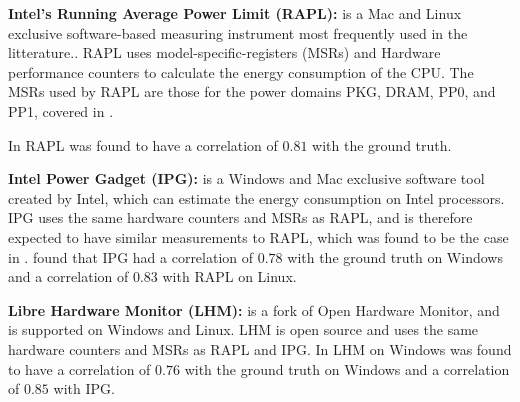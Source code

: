 \noindent\textbf{Intel's Running Average Power Limit (RAPL):} is a Mac and Linux exclusive software-based measuring instrument most frequently used in the litterature.\cite{biksbois}. RAPL uses model-specific-registers (MSRs) and Hardware performance counters to calculate the energy consumption of the CPU. The MSRs used by RAPL are those for the power domains PKG, DRAM, PP0, and PP1, covered in \cite{biksbois}. 

In \cite{biksbois} RAPL was found to have a correlation of $0.81$ with the ground truth.\cite{biksbois}\newline

\noindent\textbf{Intel Power Gadget (IPG):} is a Windows and Mac exclusive software tool created by Intel, which can estimate the energy consumption on Intel processors. %
IPG uses the same hardware counters and MSRs as RAPL\cite{FireFox}, and is therefore expected to have similar measurements to RAPL, which was found to be the case in \cite{biksbois}. \cite{biksbois} found that IPG had a correlation of $0.78$ with the ground truth on Windows and a correlation of $0.83$ with RAPL on Linux.\cite{biksbois}\newline





\noindent\textbf{Libre Hardware Monitor (LHM):} is a fork of Open Hardware Monitor, and is supported on Windows and Linux.\cite{LHM} LHM is open source and uses the same hardware counters and MSRs as RAPL and IPG. %
In \cite{biksbois} LHM on Windows was found to have a correlation of $0.76$ with the ground truth on Windows and a correlation of $0.85$ with IPG.\newline

